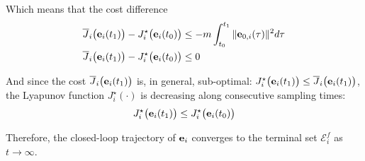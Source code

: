 Which means that the cost difference
\begin{align}
  \overline{J}_i\big(\bm{\mathbf{e}}_i(t_1)\big) - J_i^{\star}\big(\bm{\mathbf{e}}_i(t_0)\big)
  &\leq -m \int_{t_0}^{t_1} \|\bm{\mathbf{e}}_{0,i}(\tau)\|^2 d\tau \\
  \overline{J}_i\big(\bm{\mathbf{e}}_i(t_1)\big) - J_i^{\star}\big(\bm{\mathbf{e}}_i(t_0)\big) &\leq 0
\end{align}

And since the cost $\overline{J}_i\big(\bm{\mathbf{e}}_i(t_1)\big)$ is, in general,
sub-optimal: $J_i^{\star}\big(\bm{\mathbf{e}}_i(t_1)\big) \leq \overline{J}_i\big(\bm{\mathbf{e}}_i(t_1)\big)$,
the Lyapunov function $J_i^{\star}(\cdot)$ is decreasing along consecutive
sampling times:
\begin{align}
 J_i^{\star}\big(\bm{\mathbf{e}}_i(t_1)\big) \leq J_i^{\star}\big(\bm{\mathbf{e}}_i(t_0)\big)
\end{align}

Therefore, the closed-loop trajectory of $\bm{\mathbf{e}}_i$ converges to the terminal
set $\mathcal{E}_i^f$ as $t \to \infty$. \qedsymbol
